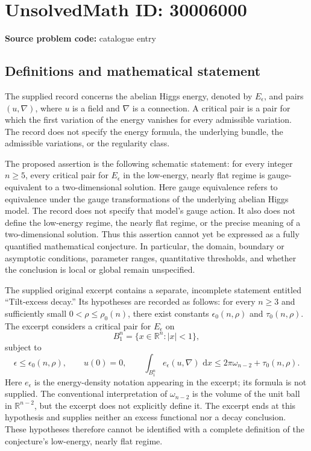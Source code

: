 \documentclass[11pt]{article}
\newcommand{\R}{\mathbb{R}}
\newcommand{\dd}{\,\mathrm{d}}
\begin{document}
\section*{UnsolvedMath ID: 30006000}
\textbf{Source problem code:} catalogue entry
\subsection{Definitions and mathematical statement}
The supplied record concerns the abelian Higgs energy, denoted by \(E_\epsilon\), and pairs \((u,\nabla)\), where \(u\) is a field and \(\nabla\) is a connection. A critical pair is a pair for which the first variation of the energy vanishes for every admissible variation. The record does not specify the energy formula, the underlying bundle, the admissible variations, or the regularity class.

The proposed assertion is the following schematic statement: for every integer \(n\geq 5\), every critical pair for \(E_\epsilon\) in the low-energy, nearly flat regime is gauge-equivalent to a two-dimensional solution. Here gauge equivalence refers to equivalence under the gauge transformations of the underlying abelian Higgs model. The record does not specify that model's gauge action. It also does not define the low-energy regime, the nearly flat regime, or the precise meaning of a two-dimensional solution. Thus this assertion cannot yet be expressed as a fully quantified mathematical conjecture. In particular, the domain, boundary or asymptotic conditions, parameter ranges, quantitative thresholds, and whether the conclusion is local or global remain unspecified.

The supplied original excerpt contains a separate, incomplete statement entitled ``Tilt-excess decay.'' Its hypotheses are recorded as follows: for every \(n\geq 3\) and sufficiently small \(0<\rho\leq\rho_0(n)\), there exist constants \(\epsilon_0(n,\rho)\) and \(\tau_0(n,\rho)\). The excerpt considers a critical pair for \(E_\epsilon\) on
\[
B_1^n=\{x\in\R^n:|x|<1\},
\]
subject to
\[
\epsilon\leq\epsilon_0(n,\rho),\qquad u(0)=0,\qquad
\int_{B_1^n}e_\epsilon(u,\nabla)\,\dd x
\leq 2\pi\omega_{n-2}+\tau_0(n,\rho).
\]
Here \(e_\epsilon\) is the energy-density notation appearing in the excerpt; its formula is not supplied. The conventional interpretation of \(\omega_{n-2}\) is the volume of the unit ball in \(\R^{n-2}\), but the excerpt does not explicitly define it. The excerpt ends at this hypothesis and supplies neither an excess functional nor a decay conclusion. These hypotheses therefore cannot be identified with a complete definition of the conjecture's low-energy, nearly flat regime.
\end{document}
